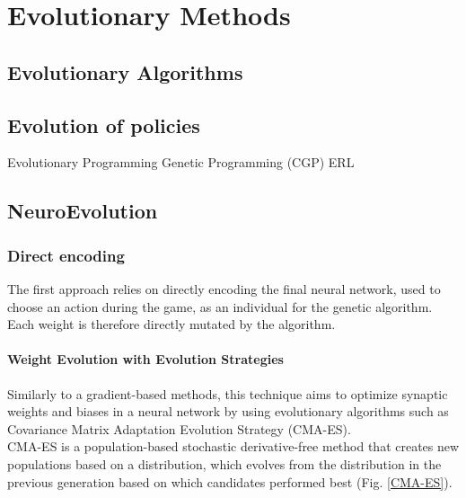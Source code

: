 \chapter{Evolutionary Methods }
\label{chap:evo}

\section{Evolutionary Algorithms}

\section{Evolution of policies}
Evolutionary Programming
Genetic Programming (CGP)
ERL

\section{NeuroEvolution}
\subsection{Direct encoding}
The first approach relies on directly encoding the final neural network, used to choose an action during the game, as an individual for the genetic algorithm. Each weight is therefore directly mutated by the algorithm.

\subsubsection{Weight Evolution with Evolution Strategies}
Similarly to a gradient-based methods, this technique aims to optimize synaptic weights and biases in a neural network by using evolutionary algorithms such as Covariance Matrix Adaptation Evolution Strategy (CMA-ES). \cite{CMA-ES} \cite{CMAES-Atari}\\ 
CMA-ES is a population-based stochastic derivative-free method that creates new populations based on a distribution, which evolves from the distribution in the previous generation based on which candidates performed best (Fig. \ref{CMA-ES}).

